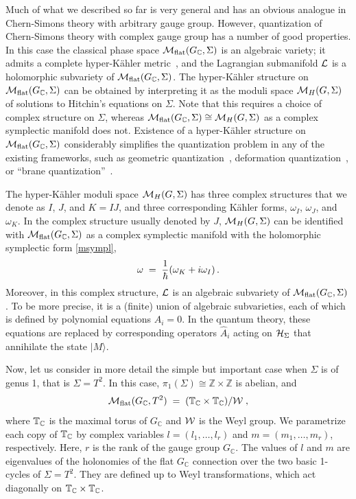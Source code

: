 \documentclass[hyper]{JHEP3}
\def\CH {{\cal H}}
\def\CL {{\cal L}}
\def\CM {{\cal M}}
\def\CW {{\cal W}}
\def\TT{{\Bbb{T}}}
\newcommand{\C}{{\mathbb{C}}}
\newcommand{\Z}{{\mathbb{Z}}}
\newcommand{\M}{{{\cal M}}_{{\rm flat}}}
\newcommand\be{\begin{equation}}
\newcommand\ee{\end{equation}}
\def\={\;=\;}
\begin{document}
Much of what we described so far is very general and has an obvious analogue
in Chern-Simons theory with arbitrary gauge group.
However, quantization of Chern-Simons theory with complex gauge group has
a number of good properties. In this case
the classical phase space $\M (G_{\C}, \Sigma)$ is an algebraic variety;
it admits a complete hyper-K\"ahler metric~\cite{hitchin-1987},
and the Lagrangian submanifold $\CL$ is a holomorphic subvariety of $\M (G_{\C}, \Sigma)$.
The hyper-K\"ahler structure on $\M (G_{\C}, \Sigma)$ can be obtained by interpreting
it as the moduli space $\CM_H (G,\Sigma)$ of solutions to Hitchin's equations on $\Sigma$.
Note that this requires a choice of complex structure on $\Sigma$,
whereas $\M (G_{\C}, \Sigma) \cong \CM_H (G,\Sigma)$
as a complex symplectic manifold does not.
Existence of a hyper-K\"ahler structure on $\M (G_{\C}, \Sigma)$
considerably simplifies the quantization problem in any of the existing frameworks,
such as geometric quantization~\cite{woodhouse-1992},
deformation quantization~\cite{bayen-1978,kontsevich-2006},
or ``brane quantization''~\cite{gukov-2008}.

The hyper-K\"ahler moduli space $\CM_H (G,\Sigma)$
has three complex structures that we denote as $I$, $J$, and $K = IJ$,
and three corresponding K\"ahler forms, $\omega_I$, $\omega_J$, and $\omega_K$.
In the complex structure usually denoted by $J$,
$\CM_H (G,\Sigma)$ can be identified
with $\M (G_{\C}, \Sigma)$ as a complex symplectic manifold
with the holomorphic symplectic form \eqref{msympl},
\be
\omega \= {1 \over \hbar} (\omega_K + i \omega_I)\,.
\ee
Moreover, in this complex structure, $\CL$ is an algebraic subvariety
of $\M (G_{\C}, \Sigma)$. To be more precise, it is a (finite) union
of algebraic subvarieties, each of which is defined by polynomial equations $A_i = 0$.
In the quantum theory, these equations are replaced by corresponding
operators $\widehat{A}_i$ acting on $\CH_{\Sigma}$
that annihilate the state $\vert M \rangle$.

Now, let us consider in more detail the simple but important case
when $\Sigma$ is of genus 1, that is $\Sigma = T^2$.
In this case, $\pi_1 (\Sigma) \cong \Z \times \Z$ is abelian, and
\be
\M (G_{\C}, T^2) \= ( \TT_{\C} \times \TT_{\C} ) / \CW\;,
\label{mflatttwo}
\ee
where $\TT_{\C}$ is the maximal torus of $G_{\C}$ and $\CW$ is the Weyl group.
We parametrize each copy of $\TT_{\C}$ by complex variables
$l = (l_1, \ldots, l_r)$ and $m = (m_1, \ldots, m_r)$, respectively.
Here, $r$ is the rank of the gauge group $G_{\C}$.
The values of $l$ and $m$ are eigenvalues of the holonomies
of the flat $G_{\C}$ connection over the two basic 1-cycles of $\Sigma = T^2$.
They are defined up to Weyl transformations, which act
diagonally on $\TT_{\C} \times \TT_{\C}$.
\end{document}
